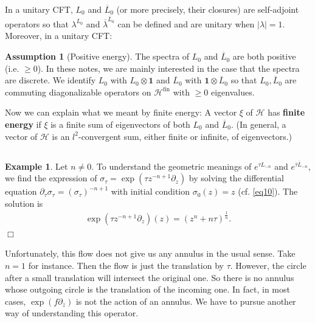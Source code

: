 \documentclass[11pt,b5paper,notitlepage]{article}
\theoremstyle{definition}
\newtheorem{eg}[df]{Example}
\newtheorem{ass}[df]{Assumption}
\theoremstyle{plain}
\newcommand{\mc}{\mathcal}
\newcommand{\ovl}{\overline}
\newcommand{\id}{\mathbf{1}}
\newcommand{\fin}{\mathrm{fin}}
\numberwithin{equation}{section}
\begin{document}
In a unitary CFT, $L_0$ and $\ovl L_0$ (or more precisely, their closures) are self-adjoint operators so that $\lambda^{L_0}$ and $\ovl\lambda^{\ovl L_0}$ can be defined and are unitary when $|\lambda|=1$. Moreover, in a unitary CFT:
\begin{ass}[Positive energy]\label{lb18}
The spectra of $L_0$ and $\ovl L_0$ are both positive (i.e. $\geq 0$). In these notes, we are mainly interested in the case that the spectra are discrete. We identify $L_0$ with $L_0\otimes\id$ and $\ovl L_0$ with $\id\otimes\ovl L_0$ so that $L_0,\ovl L_0$ are commuting diagonalizable operators on $\mc H^\fin$ with $\geq0$ eigenvalues.
\end{ass}



Now we can explain what we meant by finite energy: A vector $\xi$ of $\mc H$ has \textbf{finite energy} if $\xi$ is a finite sum of eigenvectors of both $L_0$ and $\ovl L_0$. (In general, a vector of $\mc H$ is an $l^2$-convergent sum, either finite or infinite, of eigenvectors.)




\subsection{}

\begin{eg}\label{lb20}
Let $n\neq 0$. To understand the geometric meanings of $e^{\tau L_{-n}}$ and $e^{\ovl\tau\ovl L_{-n}}$, we find the expression of $\sigma_\tau=\exp(\tau z^{-n+1}\partial_z)$ by solving the differential equation $\partial_\tau\sigma_\tau=(\sigma_\tau)^{-n+1}$ with initial condition $\sigma_0(z)=z$ (cf. \eqref{eq10}). The solution is
\begin{align}
\exp (\tau z^{-n+1}\partial_z)(z)=(z^n+n\tau)^{\frac 1n}.\label{eq17}
\end{align}
\hfill $\Box$
\end{eg}

Unfortunately, this flow does not give us any annulus in the usual sense. Take $n=1$ for instance. Then the flow is just the translation by $\tau$. However, the circle after a small translation will intersect the original one. So there is no annulus whose outgoing circle is the translation of the incoming one. In fact, in most cases,   $\exp(f\partial_z)$ is not the action of an annulus. We have to pursue another way of understanding this operator.
\end{document}
